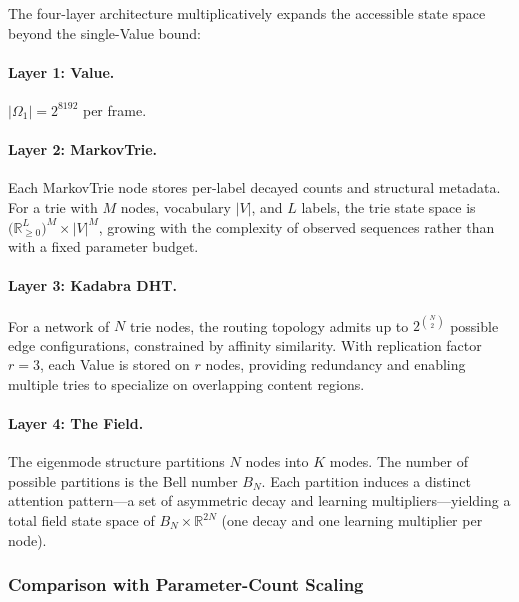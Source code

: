 The four-layer architecture multiplicatively expands the accessible
state space beyond the single-Value bound:

\paragraph{Layer 1: Value.}
$|\Omega_1| = 2^{8192}$ per frame.

\paragraph{Layer 2: MarkovTrie.}
Each MarkovTrie node stores per-label decayed counts and structural
metadata.  For a trie with $M$ nodes, vocabulary $|V|$, and $L$ labels,
the trie state space is $\bigl(\mathbb{R}_{\geq 0}^{L}\bigr)^M \times
|V|^M$, growing with the complexity of observed sequences rather than
with a fixed parameter budget.

\paragraph{Layer 3: Kadabra DHT.}
For a network of $N$ trie nodes, the routing topology admits up to
$2^{\binom{N}{2}}$ possible edge configurations, constrained by affinity
similarity.  With replication factor $r = 3$, each Value is stored on
$r$ nodes, providing redundancy and enabling multiple tries to
specialize on overlapping content regions.

\paragraph{Layer 4: The Field.}
The eigenmode structure partitions $N$ nodes into $K$ modes.  The number
of possible partitions is the Bell number $B_N$.  Each partition induces
a distinct attention pattern---a set of asymmetric decay and learning
multipliers---yielding a total field state space of $B_N \times
\mathbb{R}^{2N}$ (one decay and one learning multiplier per node).

\subsubsection{Comparison with Parameter-Count Scaling}
\label{sec:capacity_comparison}

